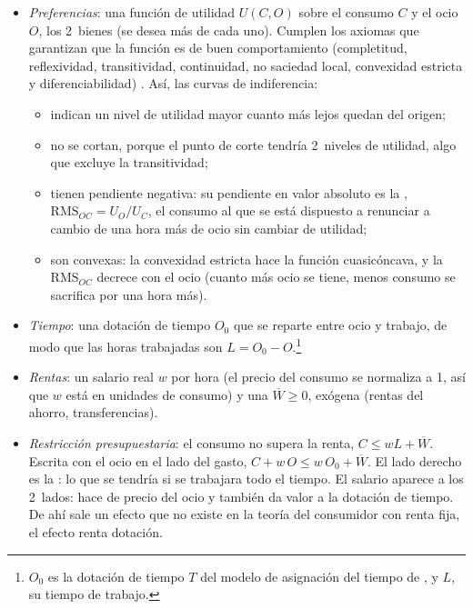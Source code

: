 \documentclass[11pt]{article}
\begin{document}
\begin{itemize}
\item \emph{Preferencias}: una función de utilidad $U(C,O)$ sobre el consumo $C$ y el ocio $O$, los 2~bienes (se desea más de cada uno). Cumplen los axiomas que garantizan que la función es de buen comportamiento (completitud, reflexividad, transitividad, continuidad, no saciedad local, convexidad estricta y diferenciabilidad) . Así, las curvas de indiferencia:
  \begin{itemize}
  \item indican un nivel de utilidad mayor cuanto más lejos quedan del origen;
  \item no se cortan, porque el punto de corte tendría 2~niveles de utilidad, algo que excluye la transitividad;
  \item tienen pendiente negativa: su pendiente en valor absoluto es la , $\mathrm{RMS}_{OC}=U_O/U_C$, el consumo al que se está dispuesto a renunciar a cambio de una hora más de ocio sin cambiar de utilidad;
  \item son convexas: la convexidad estricta hace la función cuasicóncava, y la $\mathrm{RMS}_{OC}$ decrece con el ocio (cuanto más ocio se tiene, menos consumo se sacrifica por una hora más).
  \end{itemize}
\item \emph{Tiempo}: una dotación de tiempo $O_0$ que se reparte entre ocio y trabajo, de modo que las horas trabajadas son $L=O_0-O$.\footnote{$O_0$ es la dotación de tiempo $T$ del modelo de asignación del tiempo de \textcite{Becker1965Allocation} , y $L$, su tiempo de trabajo.}
\item \emph{Rentas}: un salario real $w$ por hora (el precio del consumo se normaliza a 1, así que $w$ está en unidades de consumo) y una  $\overline{W}\geq 0$, exógena (rentas del ahorro, transferencias).
\item \emph{Restricción presupuestaria}: el consumo no supera la renta, $C\leq wL+\overline{W}$. Escrita con el ocio en el lado del gasto, $C+w\,O\leq w\,O_0+\overline{W}$. El lado derecho es la : lo que se tendría si se trabajara todo el tiempo. El salario aparece a los 2~lados: hace de precio del ocio y también da valor a la dotación de tiempo. De ahí sale un efecto que no existe en la teoría del consumidor con renta fija, el efecto renta dotación.
\end{itemize}
\end{document}
